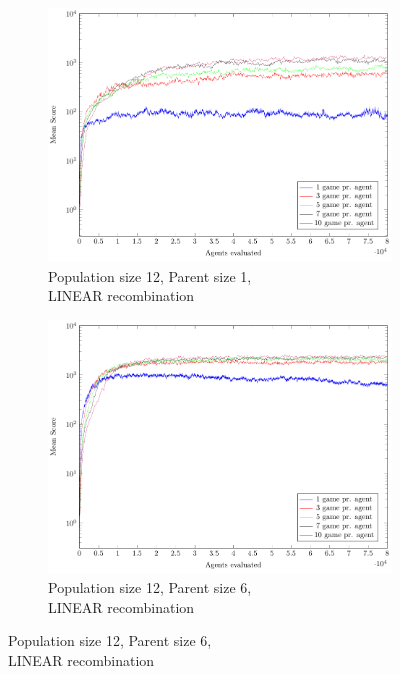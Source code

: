 \begin{figure}
\begin{subfigure}[b]{0.49\textwidth}
    \end{subfigure}
    \begin{subfigure}[b]{0.49\textwidth}
    	\caption{Population size 12, Parent size 1,\\LINEAR recombination}
        \includegraphics[width=\textwidth]{data/cma_population_offspring/12x_split/linear_l12_o1/mean/PlotFile.pdf}
    \end{subfigure}
    \begin{subfigure}[b]{0.49\textwidth}
    	\caption{Population size 12, Parent size 6,\\LINEAR recombination}
        \includegraphics[width=\textwidth]{data/cma_population_offspring/12x_split/linear_l12_o6/mean/PlotFile.pdf}
    \end{subfigure}

\end{figure}
